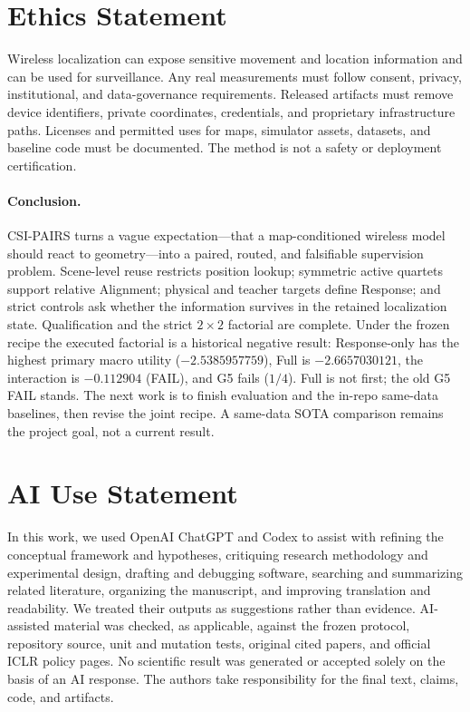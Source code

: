 \documentclass{article}
\newcommand{\method}{CSI-PAIRS}
\begin{document}
\section*{Ethics Statement}
Wireless localization can expose sensitive movement and location information
and can be used for surveillance.  Any real measurements must follow consent,
privacy, institutional, and data-governance requirements.  Released artifacts
must remove device identifiers, private coordinates, credentials, and
proprietary infrastructure paths.  Licenses and permitted uses for maps,
simulator assets, datasets, and baseline code must be documented.  The method
is not a safety or deployment certification.

\paragraph{Conclusion.}
\method{} turns a vague expectation---that a map-conditioned wireless model
should react to geometry---into a paired, routed, and falsifiable supervision
problem.  Scene-level reuse restricts position lookup; symmetric active
quartets support relative Alignment; physical and teacher targets define
Response; and strict controls ask whether the information survives in the
retained localization state.  Qualification and the strict $2\times2$
factorial are complete.  Under the frozen recipe the executed factorial is
a historical negative result: Response-only has the highest primary macro
utility ($-2.5385957759$), Full is $-2.6657030121$, the interaction is
$-0.112904$ (FAIL), and G5 fails ($1/4$).  Full is not first; the old G5
FAIL stands.  The next work is to finish evaluation and the in-repo
same-data baselines, then revise the joint recipe.  A same-data SOTA
comparison remains the project goal, not a current result.

\section*{AI Use Statement}

In this work, we used OpenAI ChatGPT and Codex to assist with refining the
conceptual framework and hypotheses, critiquing research methodology and
experimental design, drafting and debugging software, searching and summarizing
related literature, organizing the manuscript, and improving translation and
readability.  We treated their outputs as suggestions rather than evidence.
AI-assisted material was checked, as applicable, against the frozen protocol,
repository source, unit and mutation tests, original cited papers, and official
ICLR policy pages.  No scientific result was generated or accepted solely on
the basis of an AI response.  The authors take responsibility for the final
text, claims, code, and artifacts.
\end{document}
